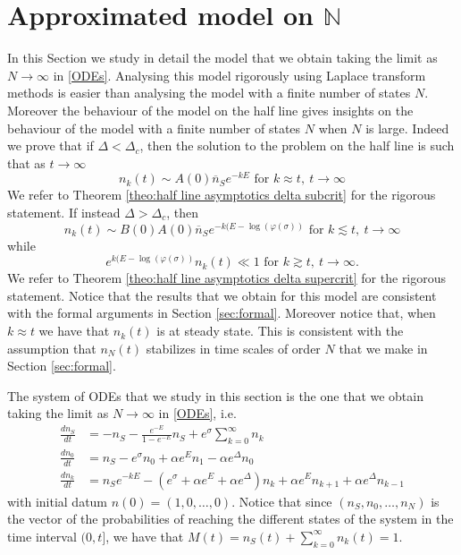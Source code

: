 \documentclass{article}
\numberwithin{equation}{section}
\theoremstyle{plain}
\begin{document}
\section{Approximated model on $\mathbb N$} \label{sec:half line}
In this Section we study in detail the model that we obtain taking the limit as $N \to \infty $ in \eqref{ODEs}. Analysing this model rigorously using  Laplace transform methods is easier than analysing the model with a finite number of states $N$. 
Moreover the behaviour of the model on the half line gives insights on the behaviour of the model with a finite number of states $N$ when $N$ is large. 
Indeed we prove that if $\Delta < \Delta_c$, then the solution to the problem on the half line is such that as $t \to \infty $
\[
n_k(t) \sim  A(0) \overline n_S e^{- k E}  \text{ for }  k \approx t, \ t \to \infty 
\]
We refer to Theorem \ref{theo:half line asymptotics delta subcrit} for the rigorous statement. 
If instead $\Delta > \Delta_c$, then 
\[
 n_k(t) \sim B(0)  A(0) \overline n_S e^{- k (E- \log(\varphi(\sigma))}  \text{ for }  k \lesssim t , \ t \to \infty 
\]
while 
\[
 e^{ k (E- \log(\varphi(\sigma))} n_k (t) \ll 1   \text{ for }  k \gtrsim t, \ t \to \infty .  
\]
We refer to Theorem \ref{theo:half line asymptotics delta supercrit} for the rigorous statement. 
Notice that the results that we obtain for this model  are consistent with the formal arguments in Section \ref{sec:formal}. 
Moreover notice that, when $k \approx t $ we have that $n_k(t) $ is at steady state. This is consistent with the assumption that $n_N(t)$ stabilizes in time scales of order $N$ that we make in Section \ref{sec:formal}.  

The system of ODEs that we study in this section is the one that we obtain taking the limit as $N \to \infty $ in \eqref{ODEs}, i.e. 
\begin{align} \label{ODE half line detail}
    \frac{d n_S }{dt} &= - n_S  - \frac{e^{- E} }{ 1- e^{- E}} n_S + e^{\sigma }  \sum_{k=0}^{\infty} n_k \nonumber \\
    \frac{d n_0 }{dt} &= n_S  - e^{\sigma } n_0 + \alpha e^E n_1 - \alpha e^{\Delta} n_0 \\
        \frac{d n_k }{dt} &= n_S e^{- k E} - \left( e^{\sigma } + \alpha e^E + \alpha e^\Delta  \right)  n_k + \alpha e^E n_{k+1}  + \alpha e^{\Delta} n_{k-1}   \nonumber
\end{align}
with initial datum $n(0)=(1, 0, \dots, 0)$.
Notice that  since $(n_S, n_0, \dots, n_N) $ is the vector of the probabilities of reaching  the different states of the system in the time interval $(0, t] $, we have that $M(t) = n_S (t) + \sum_{k=0}^{\infty} n_k(t) =1.$
\end{document}
